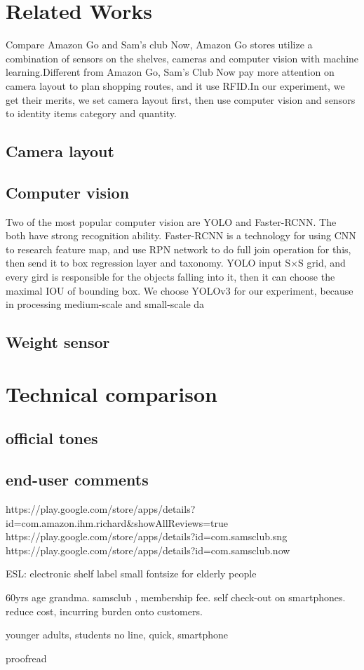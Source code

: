 \section{Related Works}
\label{sec:rw}

Compare Amazon Go and Sam's club Now, Amazon Go stores utilize a combination of sensors on the shelves, cameras and computer vision with machine learning.Different from Amazon Go, Sam's Club Now pay more attention on camera layout to plan shopping routes, and it use RFID\cite{1192765}.In our experiment, we get their merits, we set camera layout first, then use computer vision and sensors to identity items category and quantity.

\subsection{Camera layout}

\subsection{Computer vision}
Two of the most popular computer vision are YOLO and Faster-RCNN. The both have strong recognition ability. Faster-RCNN is a technology for using CNN to research feature map, and use RPN network to do full join operation for this, then send it to box regression layer and taxonomy\cite{NIPS2015_5638}. YOLO input S×S grid, and every gird is responsible for the objects falling into it, then it can choose the maximal IOU of bounding box\cite{yolov3}. We choose YOLOv3 for our experiment, because in processing medium-scale and small-scale da

\subsection{Weight sensor}


\section{ Technical comparison }

\subsection{official tones}

\subsection{end-user comments}
https://play.google.com/store/apps/details?id=com.amazon.ihm.richard&showAllReviews=true
https://play.google.com/store/apps/details?id=com.samsclub.sng
https://play.google.com/store/apps/details?id=com.samsclub.now

ESL: electronic shelf label
small fontsize for elderly people

60yrs age grandma.
samsclub , membership fee.  self check-out on smartphones.  reduce cost, incurring burden onto customers.

younger adults, students
no line, quick, smartphone 

proofread



